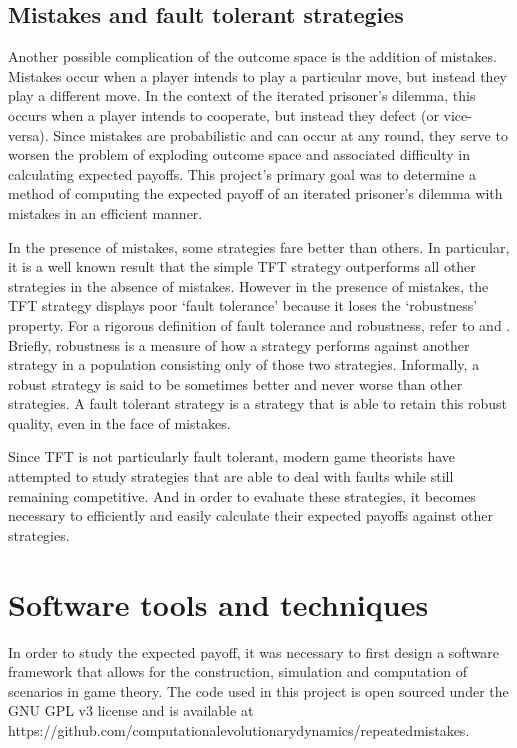 \documentclass[a4paper,12pt]{article}
\begin{document}
\subsection{Mistakes and fault tolerant strategies}

Another possible complication of the outcome space is the addition of mistakes.
Mistakes occur when a player intends to play a particular move, but instead they play a different move.
In the context of the iterated prisoner's dilemma, this occurs when a player intends to cooperate, but instead they defect (or vice-versa).
Since mistakes are probabilistic and can occur at any round, they serve to worsen the problem of exploding outcome space and associated difficulty in calculating expected payoffs.
This project's primary goal was to determine a method of computing the expected payoff of an iterated prisoner's dilemma with mistakes in an efficient manner.

In the presence of mistakes, some strategies fare better than others.
In particular, it is a well known result \cite{axelrod} that the simple TFT strategy outperforms all other strategies in the absence of mistakes.
However in the presence of mistakes, the TFT strategy displays poor `fault tolerance' because it loses the `robustness' property.
For a rigorous definition of fault tolerance and robustness, refer to \cite{pelc} and \cite{pelcpelc}.
Briefly, robustness is a measure of how a strategy performs against another strategy in a population consisting only of those two strategies.
Informally, a robust strategy is said to be sometimes better and never worse than other strategies.
A fault tolerant strategy is a strategy that is able to retain this robust quality, even in the face of mistakes.

Since TFT is not particularly fault tolerant, modern game theorists have attempted to study strategies that are able to deal with faults while still remaining competitive.
And in order to evaluate these strategies, it becomes necessary to efficiently and easily calculate their expected payoffs against other strategies.

\section{Software tools and techniques}

In order to study the expected payoff, it was necessary to first design a software framework that allows for the construction, simulation and computation of scenarios in game theory.
The code used in this project is open sourced under the GNU GPL v3 license and is available at https://github.com/computationalevolutionarydynamics/repeatedmistakes.
\end{document}
